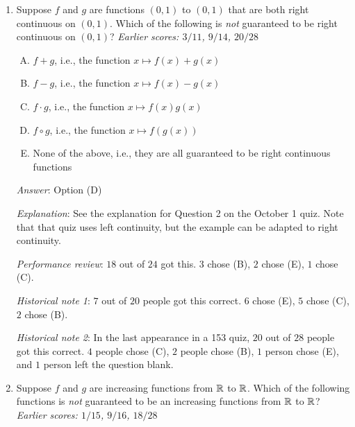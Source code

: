 \documentclass[10pt]{amsart}
\begin{document}
\begin{enumerate}
  {\em Answer}: Option (D)

  {\em Explanation}: We need to iterate $f$ enough times that
  everything gets inside $[0,1/2]$, after which it becomes
  stable. Note that each time, the value goes down by $1/7$. Thus, for
  any $x \le 1$, we need at most four steps to bring it in $[0,1/2]$,
  with the upper bound of $4$ being attained for $1$.

  {\em Performance review}: $14$ out of $24$ got this. $5$ chose (C),
  $4$ chose (A), $1$ chose (E).

  {\em Historical note 1}: $4$ out of $20$ people got this
  correct. $7$ chose (B), $7$ chose (C), $1$ each chose (A) and (E).

  {\em Historical note 2}: In the last appearance in a 153 quiz, $10$
  out of $28$ people got this correct. $9$ people chose (C), $5$
  people chose (B), $2$ people chose (A), and $2$ people left the
  question blank.
\item Suppose $f$ and $g$ are functions $(0,1)$ to $(0,1)$ that are
  both right continuous on $(0,1)$. Which of the following is {\em
  not} guaranteed to be right continuous on $(0,1)$? {\em Earlier
  scores: $3/11$, $9/14$, $20/28$}

  \begin{enumerate}[(A)]
  \item $f + g$, i.e., the function $x \mapsto f(x) + g(x)$
  \item $f - g$, i.e., the function $x \mapsto f(x) - g(x)$
  \item $f \cdot g$, i.e., the function $x \mapsto f(x)g(x)$
  \item $f \circ g$, i.e., the function $x \mapsto f(g(x))$
  \item None of the above, i.e., they are all guaranteed to be right
    continuous functions
  \end{enumerate}

  {\em Answer}: Option (D)

  {\em Explanation}: See the explanation for Question 2 on the October
  1 quiz. Note that that quiz uses left continuity, but the example
  can be adapted to right continuity.

  {\em Performance review}: $18$ out of $24$ got this. $3$ chose (B),
  $2$ chose (E), $1$ chose (C).

  {\em Historical note 1}: $7$ out of $20$ people got this
  correct. $6$ chose (E), $5$ chose (C), $2$ chose (B).

  {\em Historical note 2}: In the last appearance in a 153 quiz, $20$ out
  of $28$ people got this correct. $4$ people chose (C), $2$ people
  chose (B), $1$ person chose (E), and $1$ person left the question
  blank.
\item Suppose $f$ and $g$ are increasing functions from $\mathbb{R}$ to
  $\mathbb{R}$. Which of the following functions is {\em not} guaranteed to be
  an increasing functions from $\mathbb{R}$ to $\mathbb{R}$? {\em Earlier scores:
  $1/15$, $9/16$, $18/28$}


\end{enumerate}
\end{document}

